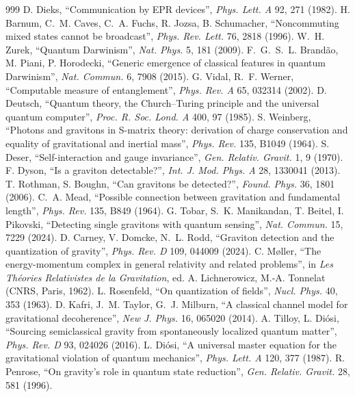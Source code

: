 \documentclass[11pt,a4paper]{article}
\theoremstyle{definition}
\theoremstyle{remark}
\theoremstyle{definition}
\begin{document}
\begin{thebibliography}{999}
 D. Dieks, ``Communication by EPR devices'', \emph{Phys. Lett. A} 92, 271 (1982).
 H. Barnum, C.~M. Caves, C.~A. Fuchs, R. Jozsa, B. Schumacher, ``Noncommuting mixed states cannot be broadcast'',
\emph{Phys. Rev. Lett.} 76, 2818 (1996).
 W.~H. Zurek, ``Quantum Darwinism'', \emph{Nat. Phys.} 5, 181 (2009).
 F.~G.~S.~L. Brand\~ao, M. Piani, P. Horodecki, ``Generic emergence of classical features in quantum Darwinism'',
\emph{Nat. Commun.} 6, 7908 (2015).
 G. Vidal, R.~F. Werner, ``Computable measure of entanglement'', \emph{Phys. Rev. A} 65, 032314 (2002).
 D. Deutsch, ``Quantum theory, the Church--Turing principle and the universal quantum computer'', \emph{Proc. R. Soc.
Lond. A} 400, 97 (1985).
 S. Weinberg, ``Photons and gravitons in S-matrix theory: derivation of charge conservation and equality of
gravitational and inertial mass'', \emph{Phys. Rev.} 135, B1049 (1964).
 S. Deser, ``Self-interaction and gauge invariance'', \emph{Gen. Relativ. Gravit.} 1, 9 (1970).
 F. Dyson, ``Is a graviton detectable?'', \emph{Int. J. Mod. Phys. A} 28, 1330041 (2013).
 T. Rothman, S. Boughn, ``Can gravitons be detected?'', \emph{Found. Phys.} 36, 1801 (2006).
 C.~A. Mead, ``Possible connection between gravitation and fundamental length'', \emph{Phys. Rev.} 135, B849 (1964).
 G. Tobar, S.~K. Manikandan, T. Beitel, I. Pikovski, ``Detecting single gravitons with quantum sensing'', \emph{Nat.
Commun.} 15, 7229 (2024).
 D. Carney, V. Domcke, N.~L. Rodd, ``Graviton detection and the quantization of gravity'', \emph{Phys. Rev. D} 109, 044009
(2024).
 C. M{\o}ller, ``The energy-momentum complex in general relativity and related problems'', in \emph{Les Th\'eories
Relativistes de la Gravitation}, ed. A. Lichnerowicz, M.-A. Tonnelat (CNRS, Paris, 1962).
 L. Rosenfeld, ``On quantization of fields'', \emph{Nucl. Phys.} 40, 353 (1963).
 D. Kafri, J.~M. Taylor, G.~J. Milburn, ``A classical channel model for gravitational decoherence'', \emph{New J. Phys.} 16,
065020 (2014).
 A. Tilloy, L. Di\'osi, ``Sourcing semiclassical gravity from spontaneously localized quantum matter'', \emph{Phys.
Rev. D} 93, 024026 (2016).
 L. Di\'osi, ``A universal master equation for the gravitational violation of quantum mechanics'', \emph{Phys. Lett. A}
120, 377 (1987).
 R. Penrose, ``On gravity's role in quantum state reduction'', \emph{Gen. Relativ. Gravit.} 28, 581 (1996).

\end{thebibliography}
\end{document}
